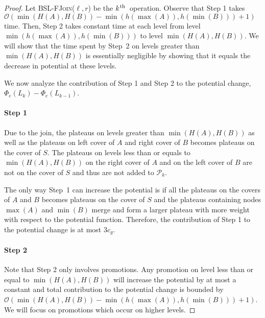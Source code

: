 \documentclass[11pt]{article}
\newcommand{\ens}[1]{\ensuremath{#1}}
\newcommand{\kth}{\ens{k^{ \mbox{\hspace{.2mm}\scriptsize th}}}}
\newcommand{\Bslfjoinx}[2]{\mbox{\textsc{BSL-FJoin(\ensuremath{#1,#2})}}}
\newcommand{\cons}[1]{\ensuremath{c_{#1}}}
\newcommand{\cnsg}{\cons g}
\newcommand{\nodeheight}[1]{\ensuremath{h(#1)}}
\newcommand{\intheight}[1]{\ensuremath{H(#1)}}
\newcommand{\intmax}[1]{\ensuremath{\max(\intl #1)}}
\newcommand{\intmin}[1]{\ensuremath{\min(\intl #1)}}
\newcommand{\intl}[1]{\ensuremath{#1}}
\newcommand{\bsl}[1]{\ensuremath{#1}}
\newcommand{\indatast}[1]{\ensuremath{L_{#1}}}
\newcommand{\locpotfun}[1]{\ensuremath{\Phi_{e}(#1)}}
\newcommand{\plats}[1]{\ensuremath{\mathcal P_{#1}}}
\begin{document}
\begin{proof} 
Let \Bslfjoinx{\ell}{r} be the \kth\ operation. Observe that Step 1 takes $\mathcal O(\min(\intheight{A},\intheight{B}) - \min(\nodeheight{\intmax{A}},\nodeheight{\intmin{B}})+1)$ time. 
Then, Step 2 takes constant time at each level from level $\min(\nodeheight{\intmax{A}}, \nodeheight{\intmin{B}})$ to level $\min(\intheight{A},\intheight{B})$. We will show that the time spent by Step~2 on levels greater than $\min(\intheight{A},\intheight{B})$ is essentially negligible by showing that it equals the decrease in potential at these levels. 

We now analyze the contribution of Step 1 and Step 2 to the potential change, $\locpotfun{\indatast k} - \locpotfun{\indatast{k-1}}$. 

\paragraph{Step 1} 

Due to the join, the plateaus on levels greater than $\min(\intheight A, \intheight B)$ as well as the plateaus on left cover of \bsl A and right cover of \bsl B becomes plateaus on the cover of \bsl S. The plateaus on levels less than or equals to $\min(\intheight A, \intheight B)$ on the right cover of \bsl A and on the left cover of \bsl B are not on the cover of \bsl S and thus are not added to \plats k. 

The only way Step~1 can increase the potential is if all the plateaus on the covers of \bsl A and \bsl B becomes plateaus on the cover of \bsl S and the plateaus containing nodes \intmax A and \intmin B merge and form a larger plateau with more weight with respect to the potential function. 
Therefore, the contribution of Step 1 to the potential change is at most $3\cnsg$. 



\paragraph{Step 2} 

Note that Step 2 only involves promotions. Any promotion on level less than or equal to $\min(\intheight A, \intheight B)$ will increase the potential by at most a constant and total contribution to the potential change is bounded by $\mathcal O(\min(\intheight{A},\intheight{B}) - \min(\nodeheight{\intmax{A}}, \nodeheight{\intmin{B}})+1)$. We will focus on promotions which occur on higher levels. 


\end{proof}
\end{document}

